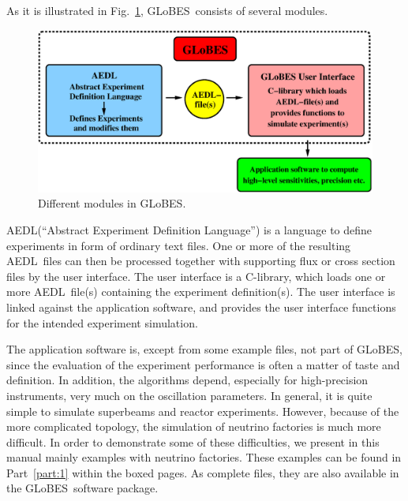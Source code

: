 \documentclass[a4paper,12pt,twoside]{book}
\newcommand{\fig}{Fig.}
\newcommand{\Part}{Part}
\newcommand{\GLOBES}{{\sf GLoBES}}
\newcommand{\AEDL}{{\sf AEDL}}
\newcommand{\figu}[1]{\fig~\ref{fig:#1}}
\begin{document}
As it is illustrated in \figu{GLOBES}, \GLOBES\ consists 
of several modules.
%
\begin{figure}[bht]
\begin{center}
\includegraphics[width=16cm]{GLOBES}
\end{center}
\caption{\label{fig:GLOBES} Different modules in \GLOBES .}
\end{figure}
%
\AEDL (``Abstract Experiment Definition Language'') is a language
to define experiments in form of ordinary text files. One or more of 
the resulting \AEDL\ files can then be processed together with supporting 
flux or cross section files by the user interface. The user interface
is a C-library, which loads one or more \AEDL\ file(s)
containing the experiment definition(s). The user interface is linked 
against the application software, and provides the user interface functions
for the intended experiment simulation. 

The application 
software is, except from some example files, not part of \GLOBES , since
the evaluation of the experiment performance is often a matter of taste
and definition. In addition, the algorithms depend, especially for
high-precision instruments, very much on the oscillation parameters.
In general, it is quite simple to simulate superbeams and reactor
experiments. However, because of the more complicated topology, the
simulation of neutrino factories is much more difficult. In order
to demonstrate some of these difficulties, we present in this manual mainly
examples with neutrino factories. These examples can be found in
\Part~\ref{part:1} within the boxed pages. As complete files, they
are also available in the \GLOBES\ software package.
\end{document}
